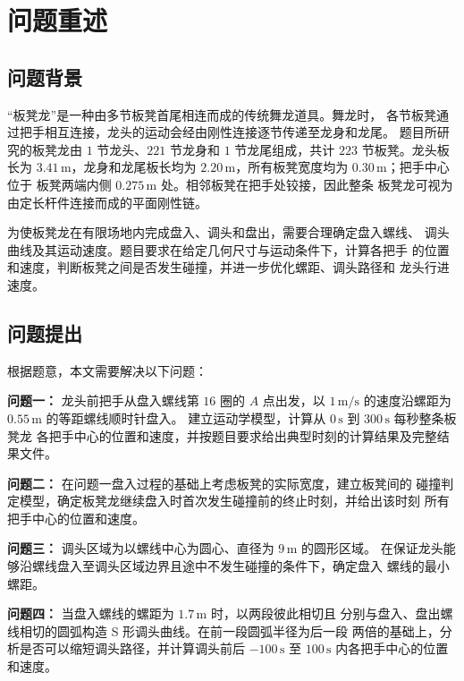 \documentclass[UTF8,fontset=windows,a4paper,12pt]{ctexart}
\begin{document}
\section{问题重述}

\subsection{问题背景}

“板凳龙”是一种由多节板凳首尾相连而成的传统舞龙道具。舞龙时，
各节板凳通过把手相互连接，龙头的运动会经由刚性连接逐节传递至龙身和龙尾。
题目所研究的板凳龙由 $1$ 节龙头、$221$ 节龙身和 $1$ 节龙尾组成，共计
$223$ 节板凳。龙头板长为 $3.41\,\mathrm{m}$，龙身和龙尾板长均为
$2.20\,\mathrm{m}$，所有板凳宽度均为 $0.30\,\mathrm{m}$；把手中心位于
板凳两端内侧 $0.275\,\mathrm{m}$ 处。相邻板凳在把手处铰接，因此整条
板凳龙可视为由定长杆件连接而成的平面刚性链。

为使板凳龙在有限场地内完成盘入、调头和盘出，需要合理确定盘入螺线、
调头曲线及其运动速度。题目要求在给定几何尺寸与运动条件下，计算各把手
的位置和速度，判断板凳之间是否发生碰撞，并进一步优化螺距、调头路径和
龙头行进速度。


\subsection{问题提出}

根据题意，本文需要解决以下问题：

\textbf{问题一：} 龙头前把手从盘入螺线第 $16$ 圈的 $A$ 点出发，以
$1\,\mathrm{m/s}$ 的速度沿螺距为 $0.55\,\mathrm{m}$ 的等距螺线顺时针盘入。
建立运动学模型，计算从 $0\,\mathrm{s}$ 到 $300\,\mathrm{s}$ 每秒整条板凳龙
各把手中心的位置和速度，并按题目要求给出典型时刻的计算结果及完整结果文件。

\textbf{问题二：} 在问题一盘入过程的基础上考虑板凳的实际宽度，建立板凳间的
碰撞判定模型，确定板凳龙继续盘入时首次发生碰撞前的终止时刻，并给出该时刻
所有把手中心的位置和速度。

\textbf{问题三：} 调头区域为以螺线中心为圆心、直径为 $9\,\mathrm{m}$ 的圆形区域。
在保证龙头能够沿螺线盘入至调头区域边界且途中不发生碰撞的条件下，确定盘入
螺线的最小螺距。

\textbf{问题四：} 当盘入螺线的螺距为 $1.7\,\mathrm{m}$ 时，以两段彼此相切且
分别与盘入、盘出螺线相切的圆弧构造 S 形调头曲线。在前一段圆弧半径为后一段
两倍的基础上，分析是否可以缩短调头路径，并计算调头前后 $-100\,\mathrm{s}$
至 $100\,\mathrm{s}$ 内各把手中心的位置和速度。
\end{document}
